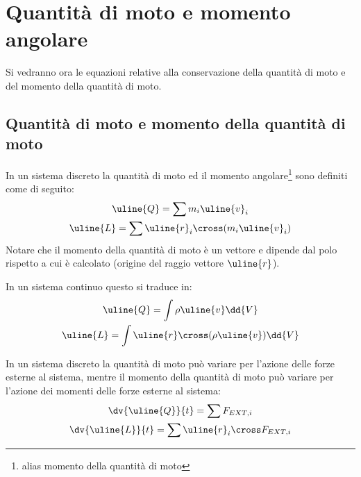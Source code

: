 %
\section{Quantità di moto e momento angolare}
Si vedranno ora le equazioni relative alla conservazione della quantità di moto e del momento della quantità di moto.

\subsection{Quantità di moto e momento della quantità di moto}
In un sistema discreto la quantità di moto ed il momento angolare\footnote{alias momento della quantità di moto} sono definiti come di seguito:
%
	\begin{equation*}
		\begin{gathered}
			\uline{Q} = \sum m_i \uline{v}_i \\
			\uline{L} = \sum \uline{r}_i \cross (m_i \uline{v}_i)
		\end{gathered}
	\end{equation*}
%
Notare che il momento della quantità di moto è un vettore e dipende dal polo rispetto a cui è calcolato (origine del raggio vettore $\uline{r}$). 

In un sistema continuo questo si traduce in:
%
	\begin{equation*}
		\begin{gathered}
			\uline{Q} = \int \rho \uline{v} \dd{V} \\
			\uline{L}  = \int \uline{r} \cross (\rho \uline{v}) \dd{V}
		\end{gathered}
	\end{equation*}

In un sistema discreto la quantità di moto può variare per l'azione delle forze esterne al sistema, mentre il momento della quantità di moto può variare per l'azione dei momenti delle forze esterne al sistema:
%
	\begin{equation*}
		\begin{gathered}
			\dv{\uline{Q}}{t} = \sum F_{EXT,i} \\
			\dv{\uline{L}}{t} = \sum \uline{r}_i \cross F_{EXT,i}
		\end{gathered}
	\end{equation*}
%

